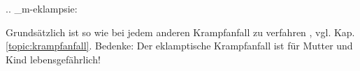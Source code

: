 
.. _m-eklampsie:


Grundsätzlich ist so wie bei jedem anderen Krampfanfall zu verfahren , vgl. Kap. \ref{topic:krampfanfall}. Bedenke:
Der eklamptische Krampfanfall ist für Mutter und Kind lebensgefährlich!